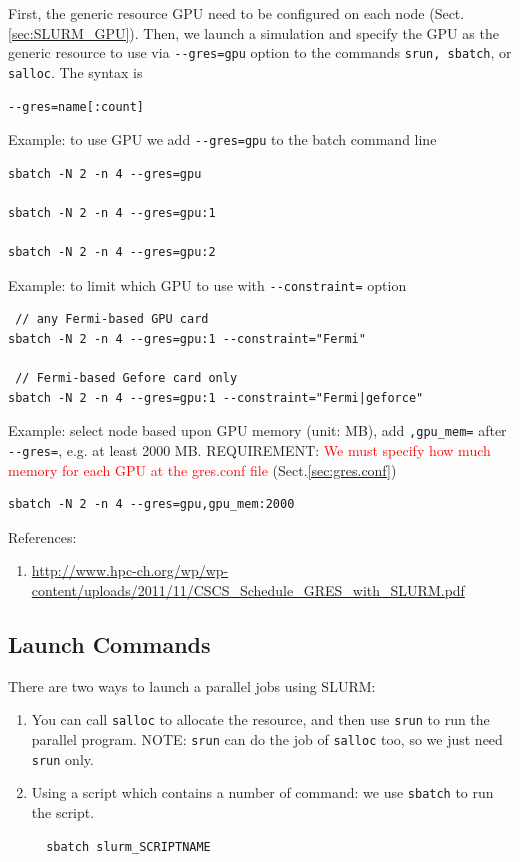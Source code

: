 First, the generic resource GPU need to be configured on each node
(Sect.\ref{sec:SLURM_GPU}). Then, we launch a simulation and specify the GPU as
the generic resource to use via \verb!--gres=gpu! option to the commands
\verb!srun, sbatch!, or \verb!salloc!. The syntax is
\begin{verbatim}
--gres=name[:count]
\end{verbatim}

Example: to use GPU we add \verb!--gres=gpu! to the
batch command line
\begin{verbatim}
sbatch -N 2 -n 4 --gres=gpu

sbatch -N 2 -n 4 --gres=gpu:1

sbatch -N 2 -n 4 --gres=gpu:2
\end{verbatim}

Example: to limit which GPU to use with \verb!--constraint=! option
\begin{verbatim}
 // any Fermi-based GPU card
sbatch -N 2 -n 4 --gres=gpu:1 --constraint="Fermi"

 // Fermi-based Gefore card only
sbatch -N 2 -n 4 --gres=gpu:1 --constraint="Fermi|geforce"
\end{verbatim} 

Example: select node based upon GPU memory (unit: MB), add \verb!,gpu_mem=!
after \verb!--gres=!, e.g. at least 2000 MB. REQUIREMENT: \textcolor{red}{We
must specify how much memory for each GPU at the gres.conf file}
(Sect.\ref{sec:gres.conf})
\begin{verbatim}
sbatch -N 2 -n 4 --gres=gpu,gpu_mem:2000 
\end{verbatim} 

References:
\begin{enumerate}
  \item
  \url{http://www.hpc-ch.org/wp/wp-content/uploads/2011/11/CSCS_Schedule_GRES_with_SLURM.pdf}
\end{enumerate}


\subsection{Launch Commands}

There are two ways to launch a parallel jobs using SLURM:
\begin{enumerate}
  \item You can call \verb!salloc! to allocate the resource, and then use
  \verb!srun! to run the parallel program. NOTE: \verb!srun! can do the job of
  \verb!salloc! too, so we just need \verb!srun! only.
  
  \item Using a script which contains a number of command: we use \verb!sbatch!
  to run the script.
  \begin{verbatim}
  sbatch slurm_SCRIPTNAME
  \end{verbatim}
\end{enumerate}

